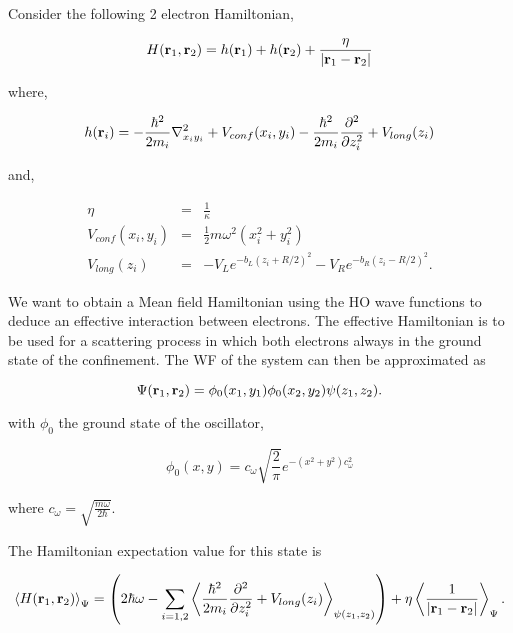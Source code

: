 \documentclass[a4paper,10pt]{article}
\begin{document}
Consider the following 2 electron Hamiltonian,


\begin{equation}
H(\mathbf{r}_1, \mathbf{r}_2) = h(\mathbf{r}_1) + h(\mathbf{r}_2) +
\frac{\eta}{\left|\mathbf{r}_1-\mathbf{r}_2\right|}
\end{equation}

where,

\begin{equation}
h(\mathbf{r}_i) = -\frac{\hbar^2}{2 m_i}\nabla^2_{x_i y_i} + V_{conf}(x_i,y_i) - \frac{\hbar^2}{2
m_i}\frac{\partial^2}{\partial z_i^2} + V_{long}(z_i)
\end{equation}

and,

\begin{eqnarray}
\eta &=& \frac{1}{\kappa} \\
V_{conf}(x_i,y_i) &=& \frac{1}{2}m\omega^2(x^{2}_i + y^{2}_i) \\
V_{long}(z_i) &=& - V_L e^{-b_L (z_i + R/2)^2} - V_R e^{-b_R (z_i - R/2)^{2}}.
\end{eqnarray}

We want to obtain a Mean field Hamiltonian using the HO wave functions to deduce
an effective interaction between electrons. The effective Hamiltonian is to be used
for a scattering process in which both electrons always in the ground state of the
confinement. The WF of the system can then
be approximated as

\begin{equation}
\Psi(\mathbf{r}_1,\mathbf{r}_2) = \phi_0(x_1,y_1)\phi_0(x_2,y_2)\psi(z_1,z_2).
\end{equation}

with $\phi_0$ the ground state of the oscillator,

\begin{equation}
\phi_0(x,y)=c_{\omega}\sqrt{\frac{2}{\pi}}e^{-(x^2+y^2)c_{\omega}^2}
\end{equation}

\noindent where $c_{\omega}=\sqrt{\frac{m \omega}{2\hbar}}$.

The Hamiltonian expectation value for this state is

\begin{equation}
\label{emvh}
\left\langle H(\mathbf{r}_1, \mathbf{r}_2)\right\rangle_\Psi =
\left(2\hbar\omega -\sum_{i=1,2} \left\langle \frac{\hbar^2}{2
m_i}\frac{\partial^2}{\partial z_i^2}+ V_{long}(z_i)\right\rangle_{\psi(z_1,z_2)}\right)+\eta \left\langle\frac{1}{\left|\mathbf{r}_1-\mathbf{r}_2\right|}\right\rangle_\Psi.
\end{equation}
\end{document}
